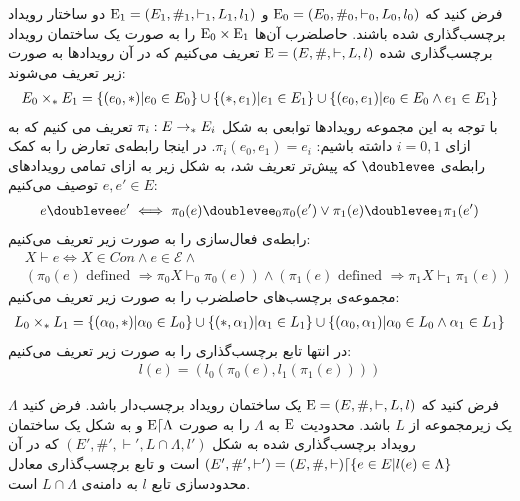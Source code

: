 \begin{definition}
    فرض کنید که
    $\mathrm{E_0} = (E_0,\#_0,\vdash_0,L_0,l_0)$
    و
    $\mathrm{E_1} = (E_1,\#_1,\vdash_1,L_1,l_1)$
    دو ساختار رویداد برچسب‌گذاری شده باشند.
    حاصلضرب آن‌ها
    $\mathrm{E}_0 \times \mathrm{E}_1$
    را به صورت یک ساختمان رویداد برچسب‌گذاری شده
    $\mathrm{E} = (E,\#,\vdash,L,l)$
    تعریف می‌کنیم که در‌ آن رویداد‌ها به صورت زیر تعریف می‌شوند:
    \begin{align*}
        E_0 \times_* E_1 =
        \{(e_0,*)|e_0 \in E_0\}
        \cup \{(*,e_1)|e_1 \in E_1\}
        \cup \{(e_0,e_1)| e_0 \in E_0 \wedge e_1 \in E_1\}
    \end{align*}
    با توجه به این مجموعه‌ رویداد‌ها توابعی به شکل
    $\pi_i: E \rightarrow_* E_i$
    تعریف می کنیم که به ازای
    $i=0,1$
    داشته باشیم:
    $\pi_i(e_0,e_1) = e_i$.
    در اینجا رابطه‌ی تعارض را به کمک رابطه‌ی
    $\doublevee$
    که پیش‌تر تعریف شد، به شکل زیر به ازای تمامی رویداد‌های
    $e,e' \in E$
    توصیف می‌کنیم:
    \begin{align*}
        e \doublevee e' \iff
        \pi_0(e)\doublevee_0 \pi_0(e')
        \vee \pi_1(e)\doublevee_1\pi_1(e')
    \end{align*}
    رابطه‌ی فعال‌سازی  را به صورت زیر تعریف می‌کنیم:
    \begin{align*}
         & X \vdash e \iff X \in Con \wedge e \in \mathcal{E} \wedge        \\
         & (\pi_0(e)\text{ defined } \Rightarrow \pi_0X\vdash_0\pi_0(e))
        \wedge (\pi_1(e)\text{ defined } \Rightarrow \pi_1X\vdash_1\pi_1(e))
    \end{align*}
    مجموعه‌ی برچسب‌های حاصلضرب را به صورت زیر تعریف می‌کنیم:
    \begin{align*}
        L_0 \times_* L_1 = \{ (\alpha_0,*)|\alpha_0 \in L_0\}
        \cup \{(*,\alpha_1)|\alpha_1 \in L_1\}
        \cup \{(\alpha_0,\alpha_1)|\alpha_0 \in L_0 \wedge \alpha_1 \in L_1\}
    \end{align*}
    در انتها تابع برچسب‌گذاری را به صورت زیر تعریف می‌کنیم:
    \begin{align*}
        l(e) = (l_0(\pi_0(e),l_1(\pi_1(e))))
    \end{align*}
\end{definition}

\begin{definition}
    فرض کنید که
    $\mathrm{E} = (E,\#,\vdash,L,l)$
    یک ساختمان رویداد برچسب‌دار باشد.
    فرض کنید
    $\Lambda$
    یک زیرمجموعه از
    $L$
    باشد.
    محدودیت
    $\mathrm{E}$
    به
    $\Lambda$
    را به صورت
    $\mathrm{E}\lceil\Lambda$
    و به شکل یک ساختمان رویداد برچسب‌گذاری شده به شکل
    $(E',\#',\vdash',L\cap\Lambda,l')$
    که در آن
    $(E',\#',\vdash') = (E,\#,\vdash)\lceil \{e \in E|l(e)\in \Lambda\}$
    است و تابع برچسب‌گذاری معادل محدودسازی تابع
    $l$
    به دامنه‌ی
    $L\cap \Lambda$
    است.
\end{definition}

